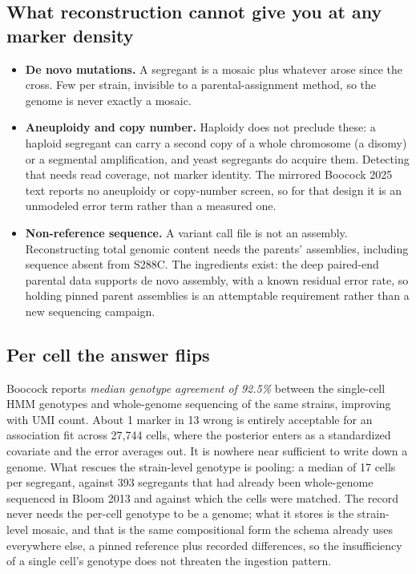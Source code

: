 \subsection{What reconstruction cannot give you at any marker density}

\begin{itemize}[leftmargin=1.2em,itemsep=1pt,topsep=2pt]
  \item \textbf{De novo mutations.} A segregant is a mosaic plus whatever arose since the
    cross. Few per strain, invisible to a parental-assignment method, so the genome is
    never exactly a mosaic.
  \item \textbf{Aneuploidy and copy number.} Haploidy does not preclude these: a haploid
    segregant can carry a second copy of a whole chromosome (a disomy) or a segmental
    amplification, and yeast segregants do acquire them. Detecting that needs read
    coverage, not marker identity. The mirrored Boocock 2025 text reports no aneuploidy
    or copy-number screen, so for that design it is an unmodeled error term rather than a
    measured one.
  \item \textbf{Non-reference sequence.} A variant call file is not an assembly.
    Reconstructing total genomic content needs the parents' assemblies, including sequence
    absent from S288C. The ingredients exist: the deep paired-end parental data supports
    de novo assembly, with a known residual error rate, so holding pinned parent
    assemblies is an attemptable requirement rather than a new sequencing campaign.
\end{itemize}

\subsection{Per cell the answer flips}

Boocock reports \emph{median genotype agreement of 92.5\%} between the single-cell HMM
genotypes and whole-genome sequencing of the same strains, improving with UMI count. About
1 marker in 13 wrong is entirely acceptable for an association fit across 27,744 cells,
where the posterior enters as a standardized covariate and the error averages out. It is
nowhere near sufficient to write down a genome. What rescues the strain-level genotype is
pooling: a median of 17 cells per segregant, against 393 segregants that had already been
whole-genome sequenced in Bloom 2013 and against which the cells were matched. The record
never needs the per-cell genotype to be a genome; what it stores is the strain-level
mosaic, and that is the same compositional form the schema already uses everywhere else,
a pinned reference plus recorded differences, so the insufficiency of a single cell's
genotype does not threaten the ingestion pattern.

